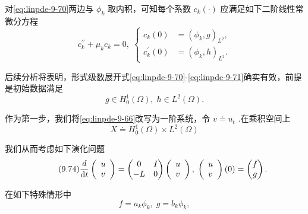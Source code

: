 对\eqref{eq:linpde-9-70}两边与 ${\phi }_{k}$ 取内积，可知每个系数 ${c}_{k}\left( \cdot \right)$ 应满足如下二阶线性常微分方程
\begin{equation}\tag{9.71}\label{eq:linpde-9-71}
{c}_{k}^{\prime \prime } + {\mu }_{k}{c}_{k} = 0,\;\left\{  \begin{array}{ll} {c}_{k}\left( 0\right) &  = {\left( {\phi }_{k},g\right) }_{{L}^{2}}, \\  {c}_{k}^{\prime }\left( 0\right) &  = {\left( {\phi }_{k},h\right) }_{{L}^{2}}. \end{array}\right.
\end{equation}

后续分析将表明，形式级数展开式\eqref{eq:linpde-9-70}-\eqref{eq:linpde-9-71}确实有效，前提是初始数据满足
\begin{equation}\tag{9.72}\label{eq:linpde-9-72}
g \in  {H}_{0}^{1}\left( \Omega \right) ,\;h \in  {L}^{2}\left( \Omega \right) .
\end{equation}

作为第一步，我们将\eqref{eq:linpde-9-66}改写为一阶系统，令 $v \doteq  {u}_{t}$ .在乘积空间上
\begin{equation}\tag{9.73}\label{eq:linpde-9-73}
X \doteq  {H}_{0}^{1}\left( \Omega \right)  \times  {L}^{2}\left( \Omega \right)
\end{equation}

我们从而考虑如下演化问题
\begin{equation}\tag{9.74}\label{eq:linpde-9-74}
\frac{d}{\mathop{}\!\mathrm{d} t}\left( \begin{array}{l} u \\  v \end{array}\right)  = \left( \begin{matrix} 0 & I \\   - L & 0 \end{matrix}\right) \left( \begin{array}{l} u \\  v \end{array}\right) ,\;\left( \begin{array}{l} u \\  v \end{array}\right) \left( 0\right)  = \begin{pmatrix}f \\ g\end{pmatrix} .
\end{equation}

在如下特殊情形中
\begin{equation}\tag{9.75}\label{eq:linpde-9-75}
f = {a}_{k}{\phi }_{k},\;g = {b}_{k}{\phi }_{k},
\end{equation}

